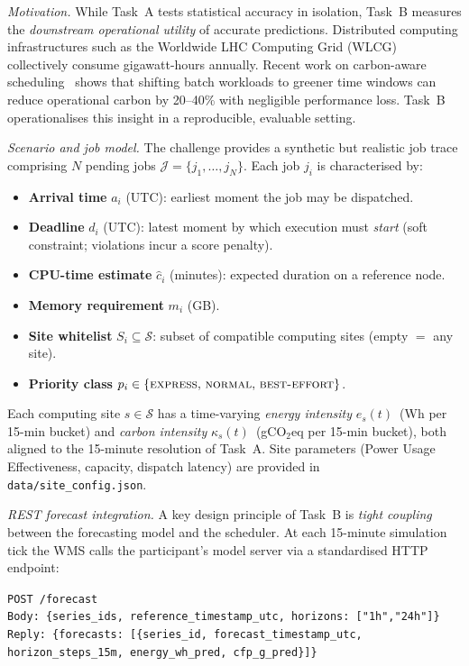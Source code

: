 \medskip
\noindent\textit{Motivation.}
While Task~A tests statistical accuracy in isolation, Task~B measures the
\emph{downstream operational utility} of accurate predictions.
Distributed computing infrastructures such as the Worldwide LHC Computing
Grid (WLCG)~\cite{Bird2011} collectively consume gigawatt-hours annually.
Recent work on carbon-aware scheduling~\cite{Radovanovic2022,Wiesner2024}
shows that shifting batch workloads to greener time windows can reduce
operational carbon by 20--40\% with negligible performance loss.
Task~B operationalises this insight in a reproducible, evaluable setting.

\medskip
\noindent\textit{Scenario and job model.}
The challenge provides a synthetic but realistic job trace comprising $N$
pending jobs $\mathcal{J} = \{j_1, \ldots, j_N\}$.
Each job $j_i$ is characterised by:
\begin{itemize}
  \item \textbf{Arrival time} $a_i$ (UTC): earliest moment the job may be
        dispatched.
  \item \textbf{Deadline} $d_i$ (UTC): latest moment by which execution must
        \emph{start} (soft constraint; violations incur a score penalty).
  \item \textbf{CPU-time estimate} $\hat{c}_i$ (minutes): expected duration on
        a reference node.
  \item \textbf{Memory requirement} $m_i$ (GB).
  \item \textbf{Site whitelist} $S_i \subseteq \mathcal{S}$: subset of
        compatible computing sites (empty $= $ any site).
  \item \textbf{Priority class}
        $p_i \in \{\textsc{express},\,\textsc{normal},\,\textsc{best\text{-}effort}\}$.
\end{itemize}
Each computing site $s \in \mathcal{S}$ has a time-varying
\emph{energy intensity} $e_s(t)$~(Wh per 15-min bucket) and
\emph{carbon intensity} $\kappa_s(t)$~(gCO$_2$eq per 15-min bucket),
both aligned to the 15-minute resolution of Task~A.
Site parameters (Power Usage Effectiveness, capacity, dispatch latency) are
provided in \texttt{data/site\_config.json}.

\medskip
\noindent\textit{REST forecast integration.}
A key design principle of Task~B is \emph{tight coupling} between the
forecasting model and the scheduler.
At each 15-minute simulation tick the WMS calls the participant's model
server via a standardised HTTP endpoint:

\begin{center}
\small
\texttt{POST /forecast}\\[2pt]
\texttt{Body: \{series\_ids, reference\_timestamp\_utc, horizons: ["1h","24h"]\}}\\[2pt]
\texttt{Reply: \{forecasts: [\{series\_id, forecast\_timestamp\_utc,}\\
\texttt{\hspace*{6em}horizon\_steps\_15m, energy\_wh\_pred, cfp\_g\_pred\}]\}}
\end{center}

